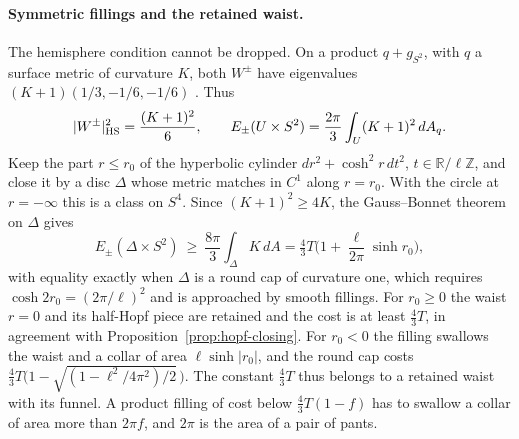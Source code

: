 \paragraph{Symmetric fillings and the retained waist.}
The hemisphere condition cannot be dropped. On a product
\(q+g_{S^2}\), with \(q\) a surface metric of curvature \(K\), both
\(W^\pm\) have eigenvalues \((K+1)(1/3,-1/6,-1/6)\)
\cite[The cost of a product circle cap]{Baker2026FixedDescent}. Thus
\begin{equation}\label{eq:product-energy}
 |W^\pm|_{\rm HS}^2=\frac{(K+1)^2}{6},\qquad
 E_\pm(U\times S^2)=\frac{2\pi}{3}\int_U(K+1)^2\,dA_q .
\end{equation}
Keep the part \(r\le r_0\) of the hyperbolic cylinder
\(dr^2+\cosh^2\!r\,dt^2\), \(t\in\mathbb R/\ell\mathbb Z\), and close
it by a disc \(\Delta\) whose metric matches in \(C^1\) along
\(r=r_0\). With the circle at \(r=-\infty\) this is a class on \(S^4\).
Since \((K+1)^2\ge4K\), the Gauss--Bonnet theorem on \(\Delta\) gives
\[
 E_\pm(\Delta\times S^2)\ \ge\ \frac{8\pi}{3}\int_\Delta K\,dA
 =\tfrac43T\Big(1+\frac{\ell}{2\pi}\sinh r_0\Big),
\]
with equality exactly when \(\Delta\) is a round cap of curvature one,
which requires \(\cosh2r_0=(2\pi/\ell)^2\) and is approached by smooth
fillings. For \(r_0\ge0\) the waist
\(r=0\) and its half-Hopf piece are retained and the cost is at least
\(\tfrac43T\), in agreement with Proposition~\ref{prop:hopf-closing}.
For \(r_0<0\) the filling swallows the waist and a collar of area
\(\ell\sinh|r_0|\), and the round cap costs
\(\tfrac43T\big(1-\sqrt{(1-\ell^2/4\pi^2)/2}\,\big)\). The constant
\(\tfrac43T\) thus belongs to a retained waist with its funnel. A
product filling of cost below \(\tfrac43T(1-f)\) has to swallow a
collar of area more than \(2\pi f\), and \(2\pi\) is the area of a pair
of pants.
